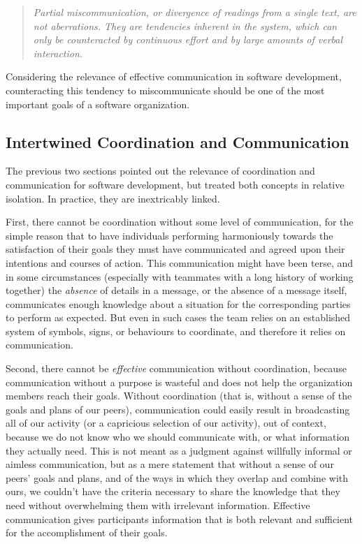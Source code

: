 \begin{quote}
\emph{Partial miscommunication, or divergence of readings from a single text, are not aberrations. They are tendencies inherent in the system, which can only be counteracted by continuous effort and by large amounts of verbal interaction.}
\end{quote}

Considering the relevance of effective communication in software development, counteracting this tendency to miscommunicate should be one of the most important goals of a software organization.


\subsection{Intertwined Coordination and Communication}
\label{sec:Intertwine}

The previous two sections pointed out the relevance of coordination and communication for software development, but treated both concepts in relative isolation. In practice, they are inextricably linked.

First, there cannot be coordination without some level of communication, for the simple reason that to have individuals performing harmoniously towards the satisfaction of their goals they must have communicated and agreed upon their intentions and courses of action. This communication might have been terse, and in some circumstances (especially with teammates with a long history of working together) the \emph{absence} of details in a message, or the absence of a message itself, communicates enough knowledge about a situation for the corresponding parties to perform as expected. But even in such cases the team relies on an established system of symbols, signs, or behaviours to coordinate, and therefore it relies on communication.

Second, there cannot be \emph{effective} communication without coordination, because communication without a purpose is wasteful and does not help the organization members reach their goals. Without coordination (that is, without a sense of the goals and plans of our peers), communication could easily result in broadcasting all of our activity (or a capricious selection of our activity), out of context, because we do not know who we should communicate with, or what information they actually need. This is not meant as a judgment against willfully informal or aimless communication, but as a mere statement that without a sense of our peers' goals and plans, and of the ways in which they overlap and combine with ours, we couldn't have the criteria necessary to share the knowledge that they need without overwhelming them with irrelevant information. Effective communication gives participants information that is both relevant and sufficient for the accomplishment of their goals.

